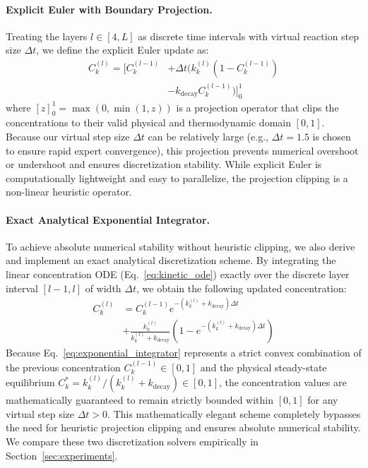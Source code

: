 \paragraph{Explicit Euler with Boundary Projection.} Treating the layers $l \in [4, L]$ as discrete time intervals with virtual reaction step size $\Delta t$, we define the explicit Euler update as:
\begin{equation}
\begin{aligned}
C_{k}^{(l)} = \Big[ C_{k}^{(l-1)} &+ \Delta t \Big( k_{k}^{(l)} (1 - C_{k}^{(l-1)}) \\
&- k_{\text{decay}} C_{k}^{(l-1)} \Big) \Big]_0^1
\end{aligned}
\label{eq:euler_step}
\end{equation}
where $[z]_0^1 = \max(0, \min(1, z))$ is a projection operator that clips the concentrations to their valid physical and thermodynamic domain $[0, 1]$. Because our virtual step size $\Delta t$ can be relatively large (e.g., $\Delta t = 1.5$ is chosen to ensure rapid expert convergence), this projection prevents numerical overshoot or undershoot and ensures discretization stability. While explicit Euler is computationally lightweight and easy to parallelize, the projection clipping is a non-linear heuristic operator.

\paragraph{Exact Analytical Exponential Integrator.} To achieve absolute numerical stability without heuristic clipping, we also derive and implement an exact analytical discretization scheme. By integrating the linear concentration ODE (Eq.~\ref{eq:kinetic_ode}) exactly over the discrete layer interval $[l-1, l]$ of width $\Delta t$, we obtain the following updated concentration:
\begin{equation}
\begin{aligned}
C_{k}^{(l)} &= C_{k}^{(l-1)} e^{-(k_{k}^{(l)} + k_{\text{decay}})\Delta t} \\
&+ \frac{k_{k}^{(l)}}{k_{k}^{(l)} + k_{\text{decay}}} \left(1 - e^{-(k_{k}^{(l)} + k_{\text{decay}})\Delta t}\right)
\end{aligned}
\label{eq:exponential_integrator}
\end{equation}
Because Eq.~\ref{eq:exponential_integrator} represents a strict convex combination of the previous concentration $C_k^{(l-1)} \in [0, 1]$ and the physical steady-state equilibrium $C_k^* = k_k^{(l)} / (k_k^{(l)} + k_{\text{decay}}) \in [0, 1]$, the concentration values are mathematically guaranteed to remain strictly bounded within $[0, 1]$ for any virtual step size $\Delta t > 0$. This mathematically elegant scheme completely bypasses the need for heuristic projection clipping and ensures absolute numerical stability. We compare these two discretization solvers empirically in Section~\ref{sec:experiments}.

